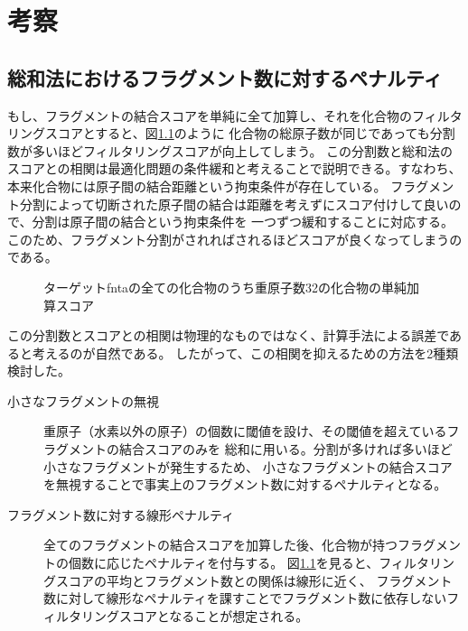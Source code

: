 \chapter{考察}

\section{総和法におけるフラグメント数に対するペナルティ}
もし、フラグメントの結合スコアを単純に全て加算し、それを化合物のフィルタリングスコアとすると、図\ref{fig:no_omit_score_graph}のように
化合物の総原子数が同じであっても分割数が多いほどフィルタリングスコアが向上してしまう。
この分割数と総和法のスコアとの相関は最適化問題の条件緩和と考えることで説明できる。すなわち、本来化合物には原子間の結合距離という拘束条件が存在している。
フラグメント分割によって切断された原子間の結合は距離を考えずにスコア付けして良いので、分割は原子間の結合という拘束条件を
一つずつ緩和することに対応する。このため、フラグメント分割がされればされるほどスコアが良くなってしまうのである。
\begin{figure}[b]
 \begin{center}
  \caption{ターゲットfntaの全ての化合物のうち重原子数32の化合物の単純加算スコア}
  \label{fig:no_omit_score_graph}
 \end{center}
\end{figure}

この分割数とスコアとの相関は物理的なものではなく、計算手法による誤差であると考えるのが自然である。
したがって、この相関を抑えるための方法を2種類検討した。
\begin{description}
\item[小さなフラグメントの無視] 
	重原子（水素以外の原子）の個数に閾値を設け、その閾値を超えているフラグメントの結合スコアのみを
	総和に用いる。分割が多ければ多いほど小さなフラグメントが発生するため、
	小さなフラグメントの結合スコアを無視することで事実上のフラグメント数に対するペナルティとなる。
\item[フラグメント数に対する線形ペナルティ]
	全てのフラグメントの結合スコアを加算した後、化合物が持つフラグメントの個数に応じたペナルティを付与する。
	図\ref{fig:no_omit_score_graph}を見ると、フィルタリングスコアの平均とフラグメント数との関係は線形に近く、
	フラグメント数に対して線形なペナルティを課すことでフラグメント数に依存しないフィルタリングスコアとなることが想定される。
\end{description}

